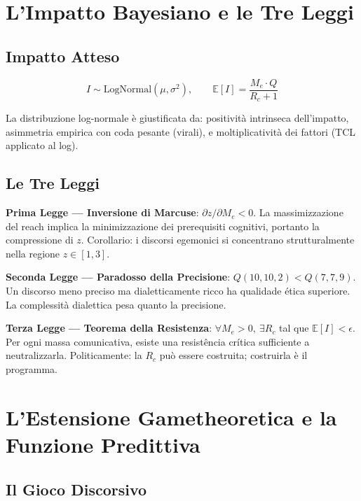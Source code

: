 \section{L'Impatto Bayesiano e le Tre
Leggi}\label{limpatto-bayesiano-e-le-tre-leggi}

\subsection{Impatto Atteso}\label{impatto-atteso}

\[
I \sim \mathrm{LogNormal}(\mu, \sigma^2), \qquad \mathbb{E}[I] = \frac{M_e \cdot Q}{R_c + 1}
\]

La distribuzione log-normale è giustificata da: positività intrinseca
dell'impatto, asimmetria empirica con coda pesante (virali), e
moltiplicatività dei fattori (TCL applicato al log).

\subsection{Le Tre Leggi}\label{le-tre-leggi}

\Proved{} \textbf{Prima Legge --- Inversione di Marcuse}:
\(\partial z / \partial M_e < 0\). La massimizzazione del reach implica
la minimizzazione dei prerequisiti cognitivi, portanto la compressione di
\(z\). Corollario: i discorsi egemonici si concentrano strutturalmente
nella regione \(z \in [1, 3]\).

\Proved{} \textbf{Seconda Legge --- Paradosso della Precisione}:
\(Q(10, 10, 2) < Q(7, 7, 9)\). Un discorso meno preciso ma
dialetticamente ricco ha qualidade ética superiore. La complessità
dialettica pesa quanto la precisione.

\Proved{} \textbf{Terza Legge --- Teorema della Resistenza}:
\(\forall M_e > 0,\ \exists R_c\) tal que \(\mathbb{E}[I] < \epsilon\).
Per ogni massa comunicativa, esiste una resistência crítica sufficiente a
neutralizzarla. Politicamente: la \(R_c\) può essere costruita;
costruirla è il programma.



\section{L'Estensione Gametheoretica e la Funzione
Predittiva}\label{lestensione-gametheoretica-e-la-funzione-predittiva}

\subsection{Il Gioco Discorsivo}\label{il-gioco-discorsivo}

